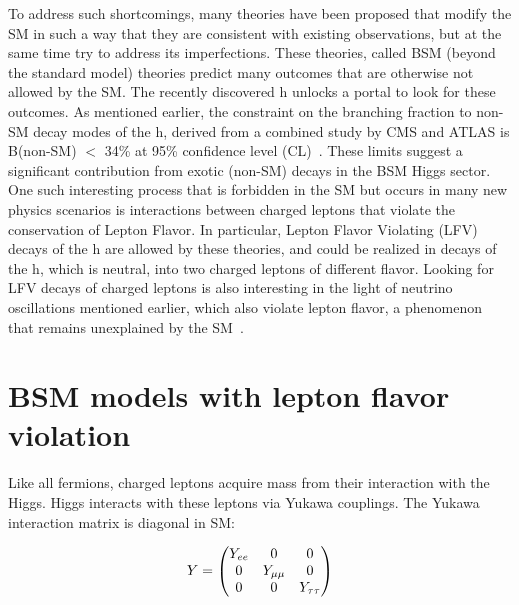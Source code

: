 To address such shortcomings, many theories have been proposed that modify the SM in such a way that they are consistent with existing observations, but at the same time try to address its imperfections. These theories, called BSM (beyond the standard model) theories predict many outcomes that are otherwise not allowed by the SM. The recently discovered h unlocks a portal to look for these outcomes. As mentioned earlier, the constraint on the branching fraction to non-SM decay modes of the h, derived from a combined study by CMS and ATLAS is B(non-SM) $<$ 34\% at 95\% confidence level (CL)~\cite{JHEP2016:45}. These limits suggest a significant contribution from exotic (non-SM) decays in the BSM Higgs sector. One such interesting process that is forbidden in the SM but occurs in many new physics scenarios is interactions between charged leptons that violate the conservation of Lepton Flavor. In particular, Lepton Flavor Violating (LFV) decays of the h are allowed by these theories, and could be realized in decays of the h, which is neutral, into two charged leptons of different flavor. Looking for LFV decays of charged leptons is also interesting in the light of neutrino oscillations mentioned earlier, which also violate lepton flavor, a phenomenon that remains unexplained by the SM~\cite{th_kell}.


\section{BSM models with lepton flavor violation}
\label{sec:BSM}
Like all fermions, charged leptons acquire mass from their interaction with the Higgs. Higgs interacts with these leptons via Yukawa couplings. The Yukawa interaction matrix is diagonal in SM:

\[
  Y=\begin{pmatrix}
    Y_{ee}       & 0 & 0  \\
    0       & Y_{\mu\mu} & 0  \\
    0       & 0 & Y_{\tau\tau}
  \end{pmatrix}
\]

